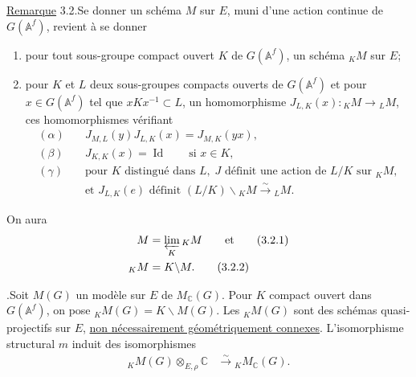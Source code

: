 \documentclass[10pt]{article}
\newcommand{\Af}{\mathbb A^f}
\newcommand{\C}{\mathbb C}
\newcommand{\id}{\operatorname{Id}}
\newcommand{\limproj}{\varprojlim}
\newcommand{\MC}{M_{\C}}
\begin{document}
\noindent\uline{Remarque} 3.2.\quad Se donner un schéma $M$ sur $E$, muni d'une action continue de $G(\Af)$, revient à se donner
\begin{enumerate}[label=(\alph*),leftmargin=2.4em]
\item pour tout sous-groupe compact ouvert $K$ de $G(\Af)$, un schéma ${}_K M$ sur $E$;
\item pour $K$ et $L$ deux sous-groupes compacts ouverts de $G(\Af)$ et pour $x\in G(\Af)$ tel que $xKx^{-1}\subset L$, un homomorphisme $J_{L,K}(x):{}_K M\longrightarrow {}_L M$, ces homomorphismes vérifiant
\begin{align*}
(\alpha)\quad&J_{M,L}(y)J_{L,K}(x)=J_{M,K}(yx),\\
(\beta)\quad&J_{K,K}(x)=\id\qquad\text{si }x\in K,\\
(\gamma)\quad&\text{pour }K\text{ distingué dans }L,\; J\text{ définit une action de }L/K\text{ sur }{}_K M,\\
&\text{et }J_{L,K}(e)\text{ définit }(L/K)\backslash {}_K M\xrightarrow{\sim}{}_L M.
\end{align*}
\end{enumerate}
On aura
\begingroup
\makeatletter
\tagsleft@true
\makeatother
\begin{align}
M&=\limproj_K {}_K M\qquad\text{et} \tag{3.2.1}\\
{}_K M&=K\backslash M. \tag{3.2.2}
\end{align}
\endgroup

.\quad Soit $M(G)$ un modèle sur $E$ de $\MC(G)$. Pour $K$ compact ouvert dans $G(\Af)$, on pose ${}_K M(G)=K\backslash M(G)$. Les ${}_K M(G)$ sont des schémas quasi-projectifs sur $E$, \uline{non nécessairement géométriquement connexes}. L'isomorphisme structural $m$ induit des isomorphismes
\begingroup
\makeatletter
\tagsleft@true
\makeatother
\begin{align}
{}_K M(G)\otimes_{E,\rho}\C&\xrightarrow{\sim}{}_K\MC(G). \tag{3.3.1}
\end{align}
\endgroup
\end{document}
